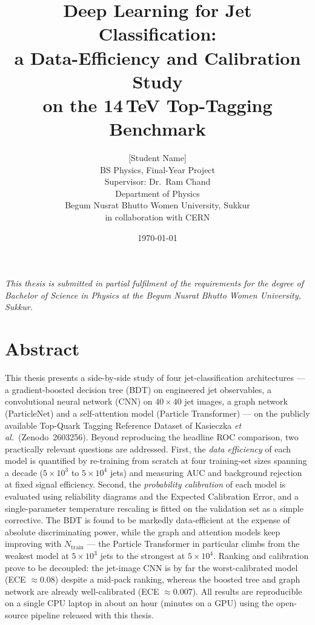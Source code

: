 \documentclass[12pt,a4paper,oneside]{report}
\title{\textbf{Deep Learning for Jet Classification:\\
       a Data-Efficiency and Calibration Study\\
       on the 14\,TeV Top-Tagging Benchmark}}
\author{[Student Name]\\
        \small BS Physics, Final-Year Project\\[2pt]
        \small Supervisor: Dr.\ Ram Chand\\
        \small Department of Physics\\
        \small Begum Nusrat Bhutto Women University, Sukkur\\
        \small in collaboration with CERN}
\date{\today}
\begin{document}
\maketitle

\thispagestyle{empty}
\vspace*{\fill}
\begin{center}\itshape
This thesis is submitted in partial fulfilment of the requirements
for the degree of Bachelor of Science in Physics at the Begum Nusrat
Bhutto Women University, Sukkur.
\end{center}
\vspace*{\fill}
\clearpage

\chapter*{Abstract}
This thesis presents a side-by-side study of four jet-classification
architectures --- a gradient-boosted decision tree (BDT) on
engineered jet observables, a convolutional neural network (CNN) on
$40\!\times\!40$ jet images, a graph network (ParticleNet) and a
self-attention model (Particle Transformer) --- on the publicly
available Top-Quark Tagging Reference Dataset of Kasieczka
\emph{et al.}\ (Zenodo~2603256).
Beyond reproducing the headline ROC comparison, two practically
relevant questions are addressed.  First, the \emph{data efficiency}
of each model is quantified by re-training from scratch at four
training-set sizes spanning a decade ($5\!\times\!10^3$ to
$5\!\times\!10^4$ jets) and measuring AUC and background rejection at
fixed signal efficiency.  Second, the \emph{probability calibration}
of each model is evaluated using reliability diagrams and the
Expected Calibration Error, and a single-parameter temperature
rescaling is fitted on the validation set as a simple corrective.
The BDT is found to be markedly data-efficient at the expense of
absolute discriminating power, while the graph and attention models
keep improving with $N_{\text{train}}$ --- the Particle Transformer
in particular climbs from the weakest model at $5\times10^3$ jets to
the strongest at $5\times10^4$.  Ranking and calibration prove to be
decoupled: the jet-image CNN is by far the worst-calibrated model
(ECE $\approx0.08$) despite a mid-pack ranking, whereas the boosted
tree and graph network are already well-calibrated
(ECE $\approx0.007$).  All results are reproducible on a single CPU
laptop in about an hour (minutes on a GPU) using the open-source
pipeline released with this thesis.
\end{document}
